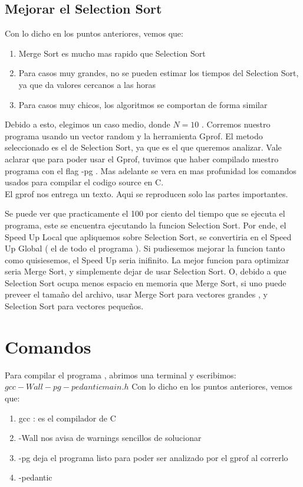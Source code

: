 \subsection{Mejorar el Selection Sort}
Con lo dicho en los puntos anteriores, vemos que:
\begin{enumerate} 
 \item {Merge Sort es mucho mas rapido que Selection Sort}
 \item {Para casos muy grandes, no se pueden estimar los tiempos del Selection Sort, ya que da valores cercanos a las horas}
 \item {Para casos muy chicos, los algoritmos se comportan de forma similar}
\end{enumerate}
Debido a esto, elegimos un caso medio, donde $N = 10$ . Corremos nuestro programa usando un vector random y la herramienta Gprof.
El metodo seleccionado es el de Selection Sort, ya que es el que queremos analizar.
Vale aclarar que para poder usar el Gprof, tuvimos que haber compilado nuestro programa con el flag -pg .
Mas adelante se vera en mas profunidad los comandos usados para compilar el codigo source en C.\\ 
El gprof nos entrega un texto. Aqui se reproducen solo las partes importantes.



Se puede ver que practicamente el 100 por ciento del tiempo que se ejecuta el programa, este se encuentra ejecutando la funcion Selection Sort.
Por ende, el Speed Up Local que apliquemos sobre Selection Sort, se convertiria en el Speed Up Global ( el de todo el programa ).
Si pudiesemos mejorar la funcion tanto como quisiesemos, el Speed Up seria inifinito.
La mejor funcion para optimizar seria Merge Sort, y simplemente dejar de usar Selection Sort.
O, debido a que Selection Sort ocupa menos espacio en memoria que Merge Sort, si uno puede preveer el tamaño del archivo, usar
Merge Sort para vectores grandes , y Selection Sort para vectores pequeños.

\section{Comandos}
Para compilar el programa , abrimos una terminal y escribimos:\\
$gcc -Wall -pg -pedantic main.h$
Con lo dicho en los puntos anteriores, vemos que:
\begin{enumerate} 
 \item gcc : es el compilador de C
 \item -Wall nos avisa de warnings sencillos de solucionar	
 \item -pg deja el programa listo para poder ser analizado por el gprof al correrlo
 \item -pedantic
\end{enumerate}

